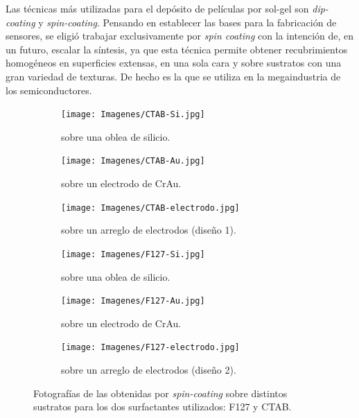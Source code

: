 		Las técnicas más utilizadas para el depósito de películas por sol-gel son \textit{dip-coating} y \textit{spin-coating}. 
		Pensando en establecer las bases para la fabricación de sensores, se eligió trabajar exclusivamente por \textit{spin coating} con la intención de, en un futuro, escalar la síntesis, ya que esta técnica permite obtener recubrimientos homogéneos en superficies extensas, en una sola cara y sobre sustratos con una gran variedad de texturas. De hecho es la que se utiliza en la megaindustria de los semiconductores.\cite{Franssila2004,Jaeger2001} 

		

			\begin{figure}[hb!]
	 	   	    \begin{subfigure}[t]{0.325\textwidth}
		        	\texttt{[image: Imagenes/CTAB-Si.jpg]}
		       		\caption{\pdmC\space sobre una oblea de silicio.}
		         	\label{fig:F127_vidrio}
		     		\end{subfigure}
	     		\begin{subfigure}[t]{0.325\textwidth}
		        	\texttt{[image: Imagenes/CTAB-Au.jpg]}
		       		\caption{\pdmC\space sobre un electrodo de Cr\textbar Au.}
		         	\label{fig:F127_silicio}
		     		\end{subfigure}
	     		\begin{subfigure}[t]{0.325\textwidth}
		        	\texttt{[image: Imagenes/CTAB-electrodo.jpg]}
		       		\caption{\pdmC\space sobre un arreglo de electrodos (diseño 1).}
		         	\label{fig:F127_Au}
		     		\end{subfigure}
	 	   	    \begin{subfigure}[t]{0.325\textwidth}
		        	\texttt{[image: Imagenes/F127-Si.jpg]}
		       		\caption{\pdmF\space sobre una oblea de silicio.}
		         	\label{fig:CTAB_vidrio}
		     		\end{subfigure}
	     		\begin{subfigure}[t]{0.325\textwidth}
		        	\texttt{[image: Imagenes/F127-Au.jpg]}
		       		\caption{\pdmF\space sobre un electrodo de Cr\textbar Au.}
		         	\label{fig:CTAB_silicio}
		     		\end{subfigure}
	     		\begin{subfigure}[t]{0.325\textwidth}
		        	\texttt{[image: Imagenes/F127-electrodo.jpg]}
		       		\caption{\pdmF\space sobre un arreglo de electrodos (diseño 2).}
		         	\label{fig:CTAB_Au}
		     		\end{subfigure}
	     		\caption[Películas mesoporosas sobre distintos soportes.]{Fotografías de las \pdm\space obtenidas por \textit{spin-coating }sobre distintos sustratos para los dos surfactantes utilizados: F127 y CTAB.}
	     		\label{fig:fotos_films}
	     	   	\end{figure}

